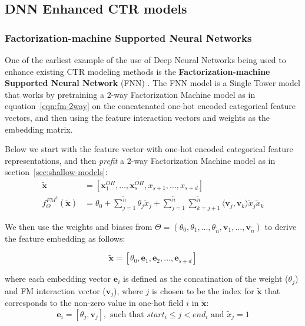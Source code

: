 \documentclass{mldsmsc}
\begin{document}
\subsection{DNN Enhanced CTR models}
\label{sec:mlp-enhanced-models}

\subsubsection{Factorization-machine Supported Neural Networks}

One of the earliest example of the use of Deep Neural Networks being used to enhance existing
CTR modeling methods is the \textbf{Factorization-machine Supported Neural Network} (FNN)
\citep{RefWorks:zhang2016deep}. The FNN model is a Single Tower model that works by pretraining
a 2-way Factorization Machine model as in equation~\ref{eqn:fm-2way} on the concatenated
one-hot encoded categorical feature vectors, and then using the feature interaction vectors and
weights as the embedding matrix.

Below we start with the feature vector with one-hot encoded categorical feature representations, and then \emph{prefit}
a 2-way Factorization Machine model as in section~\ref{sec:shallow-models}:
\begin{align*}
    \tilde{\mathbf{x}} &= \left[\mathbf{x}_1^{OH}, \ldots, \mathbf{x}_s^{OH},  x_{s+1}, \ldots, x_{s+d}\right]\\
    f_{\Theta}^{FM^2}(\tilde{\mathbf{x}} ) &= \theta_0 + \sum_{j=1}^{\tilde{n}} \theta_j \tilde{x}_j +
    \sum_{j=1}^{\tilde{n}} \sum_{k=j+1}^{\tilde{n}}
    \langle \mathbf{v}_j, \mathbf{v}_k \rangle \tilde{x}_j \tilde{x}_k
\end{align*}

We then use the weights and biases
from $\Theta = (\theta_0, \theta_1, \ldots , \theta_{\tilde{n}}, \mathbf{v}_1, \ldots, \mathbf{v}_{\tilde{n}})$ to
derive the feature embedding as follows:

\begin{equation*}
\tilde{\mathbf{x}} = \left[\theta_0, \mathbf{e}_1, \mathbf{e}_2, \ldots, \mathbf{e}_{s+d}\right]
\end{equation*}

where each embedding vector $\mathbf{e}_i$ is defined as the concatination of
the weight ($\theta_j$) and FM interaction vector ($\mathbf{v}_j$), where $j$ is chosen
to be the index for $\tilde{\mathbf{x}}$ that corresponds to the non-zero value in one-hot field
$i$ in $\tilde{\mathbf{x}}$:
\begin{equation*}
    \mathbf{e}_i = \left[\theta_j, \mathbf{v}_j\right], \text{ such that }start_i \leq j < end_i \text{ and } \tilde{x}_j =1 
\end{equation*}
\end{document}

